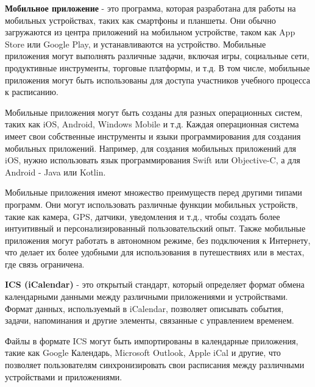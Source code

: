 
\textbf{Мобильное приложение} - это программа, которая разработана для работы на мобильных устройствах,
таких как смартфоны и планшеты. Они обычно загружаются из центра приложений на мобильном устройстве,
таком как App Store или Google Play, и устанавливаются на устройство.
Мобильные приложения могут выполнять различные задачи, включая игры, социальные сети,
продуктивные инструменты, торговые платформы, и т.д.
В том числе, мобильные приложения могут быть использованы для доступа участников учебного процесса к расписанию.

Мобильные приложения могут быть созданы для разных операционных систем, 
таких как iOS, Android, Windows Mobile и т.д.
Каждая операционная система имеет свои собственные инструменты и языки программирования для создания мобильных приложений.
Например, для создания мобильных приложений для iOS,
нужно использовать язык программирования Swift или Objective-C, а для Android - Java или Kotlin.

Мобильные приложения имеют множество преимуществ перед другими типами программ.
Они могут использовать различные функции мобильных устройств, такие как камера, GPS, датчики, уведомления и т.д.,
чтобы создать более интуитивный и персонализированный пользовательский опыт.
Также мобильные приложения могут работать в автономном режиме, без подключения к Интернету,
что делает их более удобными для использования в путешествиях или в местах, где связь ограничена.

\textbf{ICS (iCalendar)} - это открытый стандарт, 
который определяет формат обмена календарными данными между различными приложениями и устройствами. 
Формат данных, используемый в iCalendar, позволяет описывать события, задачи, напоминания и другие элементы, 
связанные с управлением временем.

Файлы в формате ICS могут быть импортированы в календарные приложения, 
такие как Google Календарь, Microsoft Outlook, Apple iCal и другие, 
что позволяет пользователям синхронизировать свои расписания между различными устройствами и приложениями.